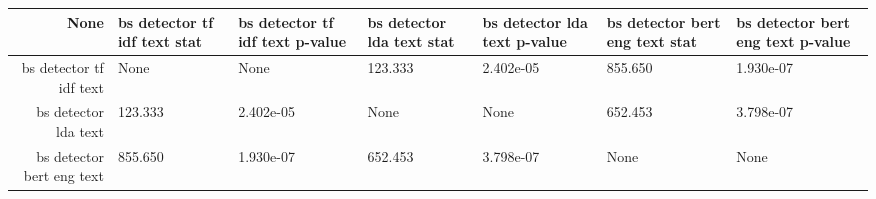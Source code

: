 \begin{tabular}{|r|l|l|l|l|l|l|}
  \hline
  None & bs detector tf idf text stat & bs detector tf idf text p-value & bs detector lda text stat & bs detector lda text p-value & bs detector bert eng text stat & bs detector bert eng text p-value \\ 
  \hline
  bs detector tf idf text & None & None & 123.333 & 2.402e-05 & 855.650 & 1.930e-07 \\ 
  \hline
  bs detector lda text & 123.333 & 2.402e-05 & None & None & 652.453 & 3.798e-07 \\ 
  \hline
  bs detector bert eng text & 855.650 & 1.930e-07 & 652.453 & 3.798e-07 & None & None \\ 
  \hline
\end{tabular}
